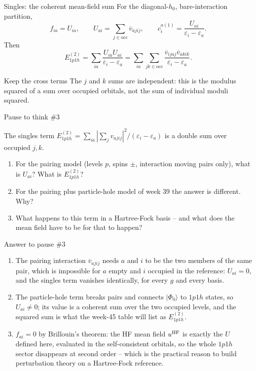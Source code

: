 \documentclass[aspectratio=169,10pt]{beamer}
\newcounter{thinkctr}
\newcommand{\thinkq}[2]{%
  \stepcounter{thinkctr}%
  \vfill
  \begin{tcolorbox}[enhanced,colback=palewarm,colframe=warm,boxrule=1.2pt,arc=4pt,
    grow to left by=6mm,grow to right by=6mm,
    left=16pt,right=16pt,top=16pt,bottom=18pt,
    fonttitle=\bfseries\Large,fontupper=\Large,
    title={Pause to think \#\thethinkctr\hfill\mdseries\normalsize(about #1 min -- discuss with your neighbour)}]
  #2
  \end{tcolorbox}
  \vfill}
\newcommand{\thinka}[1]{%
  \vfill
  \begin{tcolorbox}[enhanced,colback=paleteal,colframe=teal,boxrule=1.2pt,arc=4pt,
    grow to left by=6mm,grow to right by=6mm,
    left=16pt,right=16pt,top=16pt,bottom=18pt,
    fonttitle=\bfseries\Large,fontupper=\large,
    title={Answer to pause \#\thethinkctr}]
  #1
  \end{tcolorbox}
  \vfill}
\newcommand{\ket}[1]{\vert #1\rangle}
\newcommand{\vbar}[4]{\overline v_{#1#2#3#4}}
\newcommand{\ph}{\Phi_0}
\begin{document}
\begin{frame}{Singles: the coherent mean-field sum}
For the diagonal-\(h_0\), bare-interaction partition,
\[
f_{ia}=U_{ia},\qquad U_{ai}=\sum_{j\in\mathrm{occ}}\vbar{a}{j}{i}{j},\qquad
c_i^{a(1)}=\frac{U_{ai}}{\varepsilon_i-\varepsilon_a}.
\]
Then
\[
E^{(2)}_{1p1h}
=\sum_{ia}\frac{U_{ia}U_{ai}}{\varepsilon_i-\varepsilon_a}
=\sum_{ia}\sum_{jk\in\mathrm{occ}}
\frac{\vbar{i}{j}{a}{j}\vbar{a}{k}{i}{k}}
 {\varepsilon_i-\varepsilon_a}.
\]
\begin{exampleblock}{Keep the cross terms}
The \(j\) and \(k\) sums are independent: this is the modulus squared of a sum over occupied orbitals, not the sum of individual moduli squared.
\end{exampleblock}
\end{frame}

\begin{frame}{Pause to think \#3}
\thinkq{3}{The singles term \(E^{(2)}_{1p1h}=\sum_{ia}|\sum_jv_{ajij}|^2/(\varepsilon_i-\varepsilon_a)\) is a double sum over occupied \(j,k\).
\begin{enumerate}
\item For the pairing model (levels \(p\), spins \(\pm\), interaction moving pairs only), what is \(U_{ai}\)? What is \(E^{(2)}_{1p1h}\)?
\item For the pairing plus particle-hole model of week 39 the answer is different. Why?
\item What happens to this term in a Hartree-Fock basis -- and what does the mean field have to be for that to happen?
\end{enumerate}}
\end{frame}

\begin{frame}{Answer to pause \#3}
\thinka{%
\begin{enumerate}
\item The pairing interaction \(\vbar{a}{j}{i}{j}\) needs \(a\) and \(i\) to be the two members of the same pair, which is impossible for \(a\) empty and \(i\) occupied in the reference: \(U_{ai}=0\), and the singles term vanishes identically, for every \(g\) and every basis.
\item The particle-hole term breaks pairs and connects \(\ket{\ph}\) to \(1p1h\) states, so \(U_{ai}\ne0\); its value is a coherent sum over the two occupied levels, and the squared sum is what the week-45 table will list as \(E^{(2)}_{1p1h}\).
\item \(f_{ai}=0\) by Brillouin's theorem: the HF mean field \(u^{\rm HF}\) is exactly the \(U\) defined here, evaluated in the self-consistent orbitals, so the whole \(1p1h\) sector disappears at second order -- which is the practical reason to build perturbation theory on a Hartree-Fock reference.
\end{enumerate}}
\end{frame}
\end{document}
